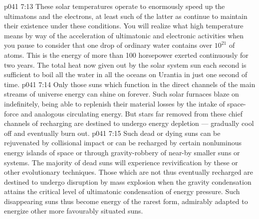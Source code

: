\vs p041 7:13 These solar temperatures operate to enormously speed up the ultimatons and the electrons, at least such of the latter as continue to maintain their existence under these conditions. You will realize what high temperature means by way of the acceleration of ultimatonic and electronic activities when you pause to consider that one drop of ordinary water contains over $10^{21}$ of atoms. This is the energy of more than 100 horsepower exerted continuously for two years. The total heat now given out by the solar system sun each second is sufficient to boil all the water in all the oceans on Urantia in just one second of time.
\vs p041 7:14 \pc Only those suns which function in the direct channels of the main streams of universe energy can shine on forever. Such solar furnaces blaze on indefinitely, being able to replenish their material losses by the intake of space\hyp{}force and analogous circulating energy. But stars far removed from these chief channels of recharging are destined to undergo energy depletion --- gradually cool off and eventually burn out.
\vs p041 7:15 Such dead or dying suns can be rejuvenated by collisional impact or can be recharged by certain nonluminous energy islands of space or through gravity\hyp{}robbery of near\hyp{}by smaller suns or systems. The majority of dead suns will experience revivification by these or other evolutionary techniques. Those which are not thus eventually recharged are destined to undergo disruption by mass explosion when the gravity condensation attains the critical level of ultimatonic condensation of energy pressure. Such disappearing suns thus become energy of the rarest form, admirably adapted to energize other more favourably situated suns.
